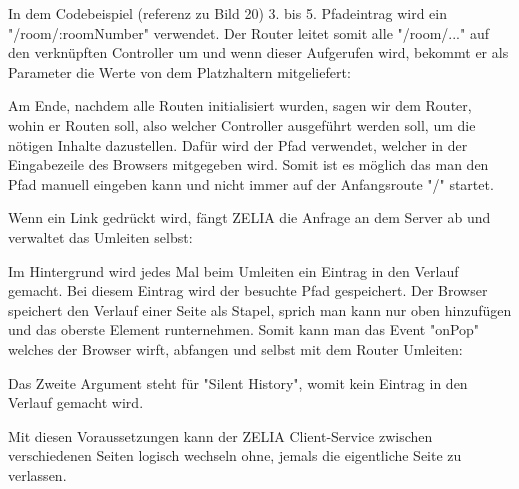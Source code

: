 In dem Codebeispiel (referenz zu Bild 20)  3. bis 5. Pfadeintrag wird ein "/room/:roomNumber" verwendet. Der Router leitet somit alle "/room/..." auf den verknüpften Controller um und wenn dieser Aufgerufen wird, bekommt er als Parameter die Werte von dem Platzhaltern mitgeliefert:


Am Ende, nachdem alle Routen initialisiert wurden, sagen wir dem Router, wohin er Routen soll, also welcher Controller ausgeführt werden soll, um die nötigen Inhalte dazustellen. Dafür wird der Pfad verwendet, welcher in der Eingabezeile des Browsers mitgegeben wird. Somit ist es möglich das man den Pfad manuell eingeben kann und nicht immer auf der Anfangsroute "/" startet.

Wenn ein Link gedrückt wird, fängt ZELIA die Anfrage an dem Server ab und verwaltet das Umleiten selbst:


Im  Hintergrund wird jedes Mal beim Umleiten ein Eintrag in den Verlauf gemacht. Bei diesem Eintrag wird der besuchte Pfad gespeichert. Der Browser speichert den Verlauf einer Seite als Stapel, sprich man kann nur oben hinzufügen und das oberste Element runternehmen. Somit kann man das Event "onPop" welches der Browser wirft, abfangen und selbst mit dem Router Umleiten:


Das Zweite Argument steht für "Silent History", womit kein Eintrag in den Verlauf gemacht wird.

Mit diesen Voraussetzungen kann der ZELIA Client-Service zwischen verschiedenen Seiten logisch wechseln ohne, jemals die eigentliche Seite zu verlassen.

